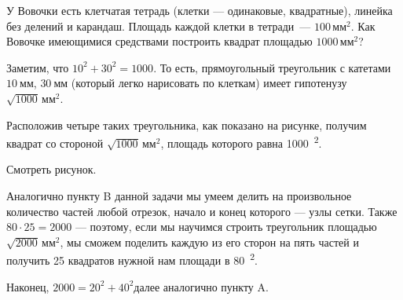 \begin{itemize}

\itA У Вовочки есть клетчатая тетрадь (клетки — одинаковые, квадратные), линейка без делений и карандаш. Площадь каждой клетки в тетради~— $100\,\text{мм}^2$. Как Вовочке имеющимися средствами построить квадрат площадью $1000\,\text{мм}^2$?

Заметим, что $10^2 + 30^2 = 1000$. То есть, прямоугольный треугольник с катетами $\SI{10}{\text{мм}}$, $\SI{30}{\text{мм}}$ (который легко нарисовать по клеткам) имеет гипотенузу $\sqrt{1000}\,\text{мм}^2$.

Расположив четыре таких треугольника, как показано на рисунке, получим квадрат со стороной $\sqrt{1000}\,\text{мм}^2$, площадь которого равна \SI{1000}{^2}.


Смотреть рисунок.

\itC Аналогично пункту B данной задачи мы умеем делить на произвольное количество частей любой отрезок, начало и конец которого — узлы сетки. Также $80 \cdot 25 = 2000$ — поэтому, если мы научимся строить треугольник площадью $\sqrt{2000}\,\text{мм}^2$, мы сможем поделить каждую из его сторон на пять частей и получить 25 квадратов нужной нам площади в \SI{80}{^2}.

Наконец, $2000 = 20^2 + 40^2$\scolon далее аналогично пункту A.
\end{itemize}